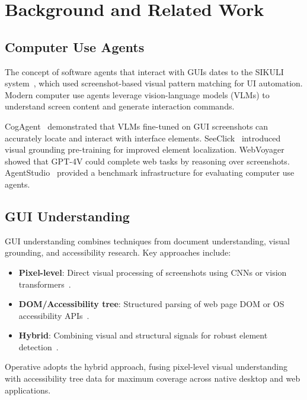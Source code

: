 \section{Background and Related Work}

\label{sec:background}

\subsection{Computer Use Agents}

The concept of software agents that interact with GUIs dates to the SIKULI system~\cite{yeh2009sikuli}, which used screenshot-based visual pattern matching for UI automation. Modern computer use agents leverage vision-language models (VLMs) to understand screen content and generate interaction commands.

CogAgent~\cite{hong2024cogagent} demonstrated that VLMs fine-tuned on GUI screenshots can accurately locate and interact with interface elements. SeeClick~\cite{cheng2024seeclick} introduced visual grounding pre-training for improved element localization. WebVoyager~\cite{he2024webvoyager} showed that GPT-4V could complete web tasks by reasoning over screenshots. AgentStudio~\cite{zheng2024agentstudio} provided a benchmark infrastructure for evaluating computer use agents.

\subsection{GUI Understanding}

GUI understanding combines techniques from document understanding, visual grounding, and accessibility research. Key approaches include:

\begin{itemize}[leftmargin=*]
    \item \textbf{Pixel-level}: Direct visual processing of screenshots using CNNs or vision transformers~\cite{dosovitskiy2020image}.
    \item \textbf{DOM/Accessibility tree}: Structured parsing of web page DOM or OS accessibility APIs~\cite{he2024webvoyager}.
    \item \textbf{Hybrid}: Combining visual and structural signals for robust element detection~\cite{hong2024cogagent}.
\end{itemize}

Operative adopts the hybrid approach, fusing pixel-level visual understanding with accessibility tree data for maximum coverage across native desktop and web applications.

